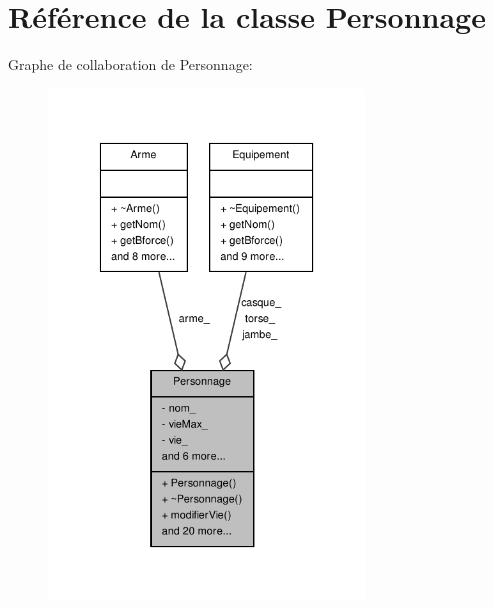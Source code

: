 \section{Référence de la classe Personnage}
\label{class_personnage}


Graphe de collaboration de Personnage\-:\nopagebreak
\begin{figure}[H]
\begin{center}
\leavevmode
\includegraphics[width=238pt]{class_personnage__coll__graph}
\end{center}
\end{figure}
